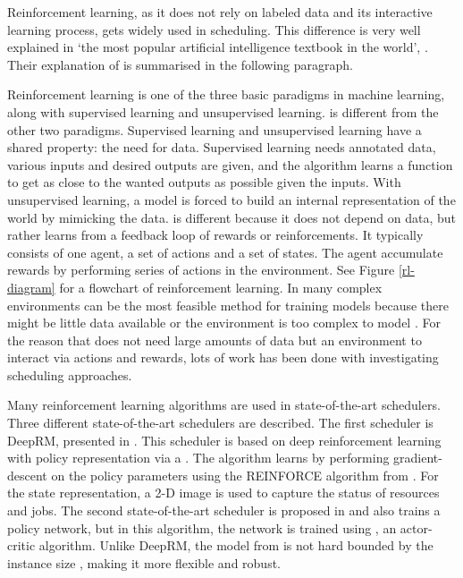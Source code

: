 Reinforcement learning, as it does not rely on labeled data and its
interactive learning process, gets widely used in scheduling. This difference
is very well explained in `the most popular artificial intelligence textbook
in the world'\footnotemark, . Their explanation of \rl is
summarised in the following paragraph.


Reinforcement learning is one of the three basic paradigms in machine
learning, along with supervised learning and unsupervised learning. \rl is
different from the other two paradigms. Supervised learning and unsupervised
learning have a shared property: the need for data. Supervised learning needs
annotated data, various inputs and desired outputs are given, and the
algorithm learns a function to get as close to the wanted outputs as possible
given the inputs. With unsupervised learning, a model is forced to build an
internal representation of the world by mimicking the data. \rl is different
because it does not depend on data, but rather learns from a feedback loop of
rewards or reinforcements. It typically consists of one agent, a set of
actions and a set of states. The agent accumulate rewards by performing series
of actions in the environment. See Figure \ref{rl-diagram} for a flowchart of
reinforcement learning. In many complex environments \rl can be the most
feasible method for training models because there might be little data
available or the environment is too complex to model \cite{russell2010}. For
the reason that \rl does not need large amounts of data but an environment to
interact via actions and rewards, lots of work has been done with
investigating \rlbased scheduling approaches.



Many reinforcement learning algorithms are used in state-of-the-art \rlbased
schedulers. Three different state-of-the-art \rl schedulers are described. The
first scheduler is DeepRM, presented in . This scheduler is
based on deep reinforcement learning with policy representation via a \dnn.
The algorithm learns by performing gradient-descent on the policy parameters
using the REINFORCE algorithm from . For the state
representation, a 2-D image is used to capture the status of resources and
jobs. The second state-of-the-art scheduler is proposed in 
and also trains a policy network, but in this algorithm, the network is trained
using \ppo, an actor-critic algorithm. Unlike DeepRM, the model from
 is not hard bounded by the instance size
\cite[p.~5]{zhang2020}, making it more flexible and robust.


